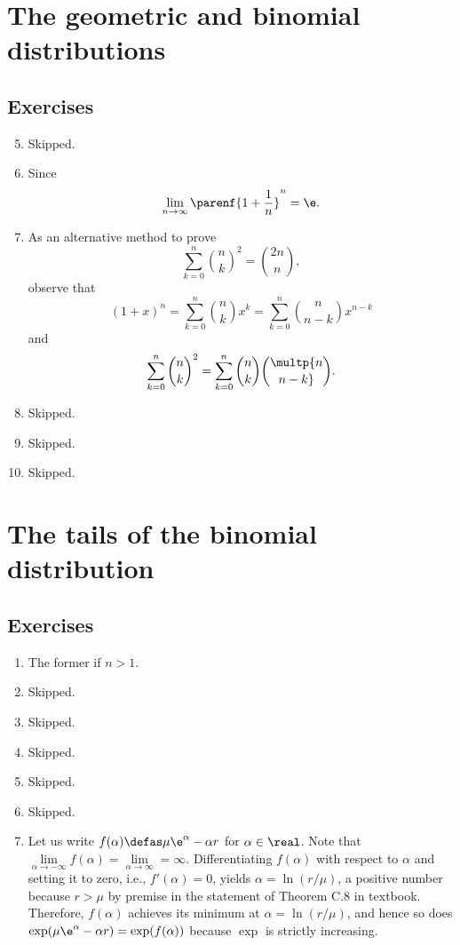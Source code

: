 \section{The geometric and binomial distributions}
\subsection*{Exercises}
\begin{enumerate}[\thesection-1]
%
\setcounter{enumi}{4}
%
\item Skipped.
%
\item Since
\[
\lim_{n \to \infty} \parenf{1 + \frac{1}{n}}^n = \e.
\]
%
\item As an alternative method to prove
\[
\sum^n_{k = 0} {n \choose k}^2 = {2n \choose n},
\]
observe that
\[
(1 + x)^n = \sum^n_{k = 0} {n \choose k} x^k = \sum^n_{k = 0} {n \choose n - k} x^{n - k}
\]
and
\[
\sum^n_{k = 0} {n \choose k}^2 = \sum^n_{k = 0} {n \choose k} \multp {n \choose n - k}.
\]
%
\item Skipped.
%
\item Skipped.
%
\item Skipped.
%
\end{enumerate}

\section{The tails of the binomial distribution}
\subsection*{Exercises}
\begin{enumerate}[\thesection-1]
%
\item The former if $n > 1$.
%
\item Skipped.
%
\item Skipped.
%
\item Skipped.
%
\item Skipped.
%
\item Skipped.
%
\item Let us write $f(\alpha) \defas \mu \e^\alpha - \alpha r$ for $\alpha \in \real$. Note that $\lim\limits_{\alpha \to -\infty} f(\alpha) = \lim\limits_{\alpha \to \infty} = \infty$. Differentiating $f(\alpha)$ with respect to $\alpha$ and setting it to zero, i.e., $f'(\alpha) = 0$, yields $\alpha = \ln(r/\mu)$, a positive number because $r > \mu$ by premise in the statement of Theorem C.8 in textbook. Therefore, $f(\alpha)$ achieves its minimum at $\alpha = \ln(r/\mu)$, and hence so does $\exp(\mu \e^\alpha - \alpha r) = \exp(f(\alpha))$ because $\exp$ is strictly increasing.
%
\end{enumerate}

